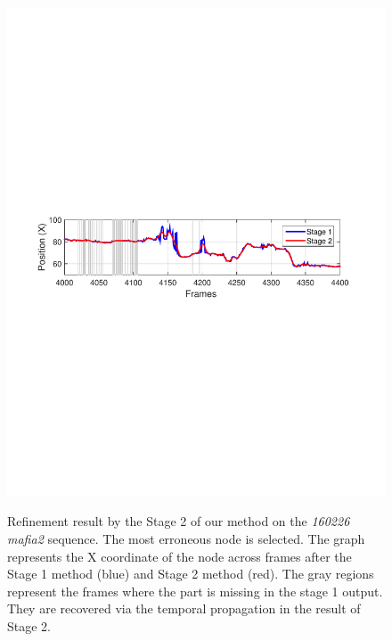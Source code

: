 \begin{figure}[t]
	\centering
	\captionsetup{position=top}
	\includegraphics[trim=40 340 60 340,clip,width=\linewidth]{figures/quant_stage2/160226_mafia2-Stage2-nodeLocation-h7-j11-1.pdf}   \\
	\caption{Refinement result by the Stage 2 of our method on the \emph{160226 mafia2} sequence. The most erroneous node is selected. The graph represents the X coordinate of the node across frames after the Stage 1 method (blue) and Stage 2 method (red). The gray regions represent the frames where the part is missing in the stage 1 output. They are recovered via the temporal propagation in the result of Stage 2. } 
	\label{fig:quant_stage2}
\end{figure}


